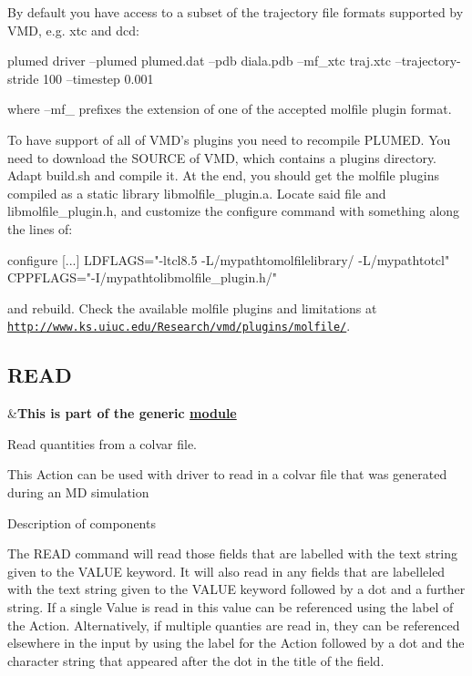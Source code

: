 By default you have access to a subset of the trajectory file formats supported by V\+M\+D, e.\+g. xtc and dcd\+:

\begin{DoxyVerb}plumed driver --plumed plumed.dat --pdb diala.pdb --mf_xtc traj.xtc --trajectory-stride 100 --timestep 0.001
\end{DoxyVerb}


where --mf\+\_\+ prefixes the extension of one of the accepted molfile plugin format.

To have support of all of V\+M\+D's plugins you need to recompile P\+L\+U\+M\+E\+D. You need to download the S\+O\+U\+R\+C\+E of V\+M\+D, which contains a plugins directory. Adapt build.\+sh and compile it. At the end, you should get the molfile plugins compiled as a static library libmolfile\+\_\+plugin.\+a. Locate said file and libmolfile\+\_\+plugin.\+h, and customize the configure command with something along the lines of\+:

\begin{DoxyVerb}configure [...] LDFLAGS="-ltcl8.5 -L/mypathtomolfilelibrary/ -L/mypathtotcl" CPPFLAGS="-I/mypathtolibmolfile_plugin.h/"
\end{DoxyVerb}


and rebuild. Check the available molfile plugins and limitations at \href{http://www.ks.uiuc.edu/Research/vmd/plugins/molfile/}{\tt http\+://www.\+ks.\+uiuc.\+edu/\+Research/vmd/plugins/molfile/}. \hypertarget{READ}{}\subsection{R\+E\+A\+D}\label{READ}
\begin{TabularC}{2}
\hline
&{\bfseries  This is part of the generic \hyperlink{mymodules}{module }}   \\
\end{TabularC}
Read quantities from a colvar file.

This Action can be used with driver to read in a colvar file that was generated during an M\+D simulation

\begin{DoxyParagraph}{Description of components}

\end{DoxyParagraph}
The R\+E\+A\+D command will read those fields that are labelled with the text string given to the V\+A\+L\+U\+E keyword. It will also read in any fields that are labelleled with the text string given to the V\+A\+L\+U\+E keyword followed by a dot and a further string. If a single Value is read in this value can be referenced using the label of the Action. Alternatively, if multiple quanties are read in, they can be referenced elsewhere in the input by using the label for the Action followed by a dot and the character string that appeared after the dot in the title of the field.


